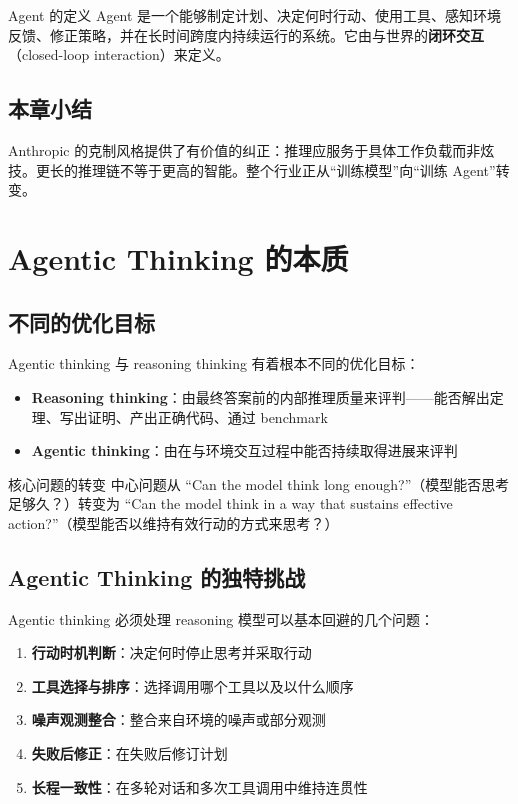 \documentclass[a4paper]{article}
\begin{document}
\begin{knowledgebox}{Agent 的定义}
Agent 是一个能够制定计划、决定何时行动、使用工具、感知环境反馈、修正策略，并在长时间跨度内持续运行的系统。它由与世界的\textbf{闭环交互}（closed-loop interaction）来定义。
\end{knowledgebox}

\subsection{本章小结}

Anthropic 的克制风格提供了有价值的纠正：推理应服务于具体工作负载而非炫技。更长的推理链不等于更高的智能。整个行业正从``训练模型''向``训练 Agent''转变。


\section{Agentic Thinking 的本质}

\subsection{不同的优化目标}

Agentic thinking 与 reasoning thinking 有着根本不同的优化目标：

\begin{itemize}
    \item \textbf{Reasoning thinking}：由最终答案前的内部推理质量来评判——能否解出定理、写出证明、产出正确代码、通过 benchmark
    \item \textbf{Agentic thinking}：由在与环境交互过程中能否持续取得进展来评判
\end{itemize}

\begin{importantbox}{核心问题的转变}
中心问题从 ``Can the model think long enough?''（模型能否思考足够久？）转变为 ``Can the model think in a way that sustains effective action?''（模型能否以维持有效行动的方式来思考？）
\end{importantbox}

\subsection{Agentic Thinking 的独特挑战}

Agentic thinking 必须处理 reasoning 模型可以基本回避的几个问题：

\begin{enumerate}
    \item \textbf{行动时机判断}：决定何时停止思考并采取行动
    \item \textbf{工具选择与排序}：选择调用哪个工具以及以什么顺序
    \item \textbf{噪声观测整合}：整合来自环境的噪声或部分观测
    \item \textbf{失败后修正}：在失败后修订计划
    \item \textbf{长程一致性}：在多轮对话和多次工具调用中维持连贯性
\end{enumerate}
\end{document}
